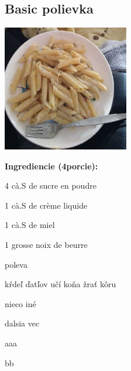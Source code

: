 \setcounter{step}{0}

\subsection{ Basic polievka }

\begin{ingredient}
  
      \includegraphics[height=5.5cm]{images/cestoviny}
  
  \def\portions{  }
  \textbf{ {\normalsize Ingrediencie (4porcie):} }

  \begin{main}
      \item 4 cà.S de sucre en poudre
      \item 1 cà.S de crème liquide
      \item 1 cà.S de miel
      \item 1 grosse noix de beurre
  \end{main}
  
    \begin{subingredient}{poleva}
        \item kŕdeľ ďatľov učí koňa žrať kôru
        \item nieco iné
    \end{subingredient}
  
    \begin{subingredient}{dalsia vec}
        \item aaa
        \item bb
    \end{subingredient}
  
\end{ingredient}
